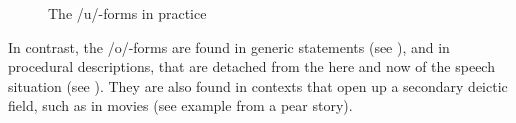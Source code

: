 \begin{figure}
\centering
\setlength{\fboxsep}{0pt}
\caption{The /u/-forms in practice}\label{deixill-1}
\end{figure}


	
	
In contrast, the /o/-forms are found in generic statements (see \Next[a]), and in procedural descriptions, that are detached from the here and now of the speech situation (see \Next[c]). They are also found in contexts that open up a secondary deictic field, such as in movies (see example  \Next[b] from a pear story). 

